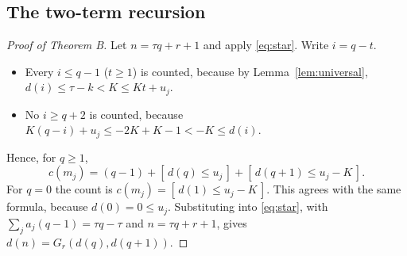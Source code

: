 \documentclass[11pt]{amsart}
\theoremstyle{definition}
\theoremstyle{remark}
\newcommand{\Iv}[1]{[\,#1\,]}
\begin{document}
\subsection{The two-term recursion}
\begin{proof}[Proof of Theorem B]
Let $n=\tau q+r+1$ and apply \eqref{eq:star}. Write $i=q-t$.
\begin{itemize}
\item Every $i\le q-1$ ($t\ge1$) is counted, because by Lemma~\ref{lem:universal}, $d(i)\le\tau-k<K\le Kt+u_j$.
\item No $i\ge q+2$ is counted, because $K(q-i)+u_j\le-2K+K-1<-K\le d(i)$.
\end{itemize}
Hence, for $q\ge1$,
\[
c(m_j)=(q-1)+\Iv{d(q)\le u_j}+\Iv{d(q+1)\le u_j-K}.
\]
For $q=0$ the count is $c(m_j)=\Iv{d(1)\le u_j-K}$. This agrees with the same formula, because $d(0)=0\le u_j$. Substituting into \eqref{eq:star}, with $\sum_ja_j(q-1)=\tau q-\tau$ and $n=\tau q+r+1$, gives $d(n)=G_r(d(q),d(q+1))$.
\end{proof}
\end{document}
